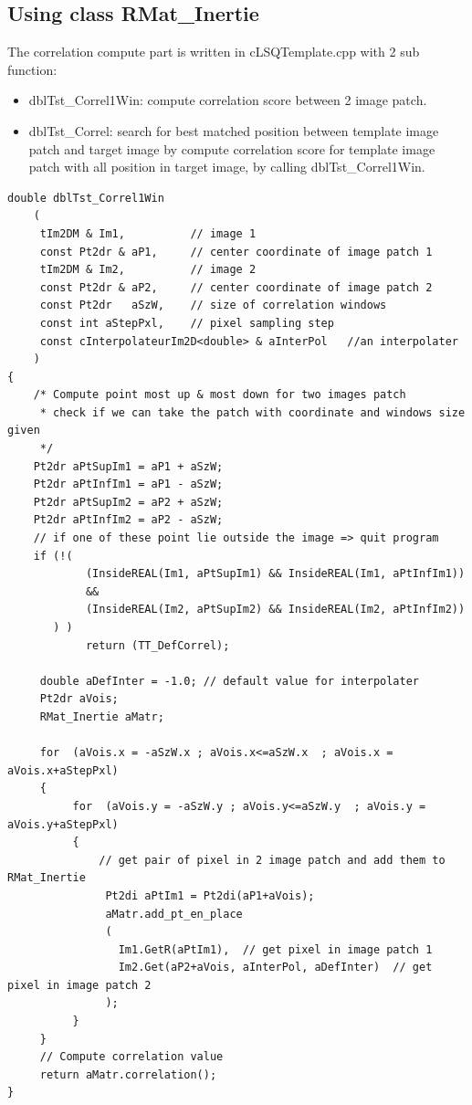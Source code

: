 \documentclass[twoside]{article}
\begin{document}
\subsection{Using class RMat\_Inertie}
The correlation compute part is written in {\color{blue}cLSQTemplate.cpp} with 2 sub function:
\begin{itemize}
	\item {\color{blue}dblTst\_Correl1Win}: compute correlation score between 2 image patch.
	\item {\color{blue}dblTst\_Correl}: search for best matched position between template image patch and target image by compute correlation score for template image patch with all position in target image, by calling {\color{blue}dblTst\_Correl1Win}.
\end{itemize}
\begin{lstlisting}
double dblTst_Correl1Win
    (
     tIm2DM & Im1,      	// image 1
     const Pt2dr & aP1,		// center coordinate of image patch 1
     tIm2DM & Im2,	  		// image 2
     const Pt2dr & aP2,		// center coordinate of image patch 2
     const Pt2dr   aSzW,	// size of correlation windows
     const int aStepPxl,	// pixel sampling step
     const cInterpolateurIm2D<double> & aInterPol	//an interpolater
    )
{
    /* Compute point most up & most down for two images patch
     * check if we can take the patch with coordinate and windows size given
     */
    Pt2dr aPtSupIm1 = aP1 + aSzW;
    Pt2dr aPtInfIm1 = aP1 - aSzW;
    Pt2dr aPtSupIm2 = aP2 + aSzW;
    Pt2dr aPtInfIm2 = aP2 - aSzW;
    // if one of these point lie outside the image => quit program
    if (!(
            (InsideREAL(Im1, aPtSupIm1) && InsideREAL(Im1, aPtInfIm1))
            &&
            (InsideREAL(Im2, aPtSupIm2) && InsideREAL(Im2, aPtInfIm2))
       ) )
            return (TT_DefCorrel);
            
     double aDefInter = -1.0; // default value for interpolater
     Pt2dr aVois;
     RMat_Inertie aMatr;

     for  (aVois.x = -aSzW.x ; aVois.x<=aSzW.x  ; aVois.x = aVois.x+aStepPxl)
     {
          for  (aVois.y = -aSzW.y ; aVois.y<=aSzW.y  ; aVois.y = aVois.y+aStepPxl)
          {
              // get pair of pixel in 2 image patch and add them to RMat_Inertie
               Pt2di aPtIm1 = Pt2di(aP1+aVois);         
               aMatr.add_pt_en_place
               (
                 Im1.GetR(aPtIm1),  // get pixel in image patch 1
                 Im2.Get(aP2+aVois, aInterPol, aDefInter)  // get pixel in image patch 2
               );
          }
     }
	 // Compute correlation value
     return aMatr.correlation();
}
\end{lstlisting}
\end{document}
